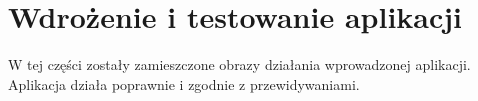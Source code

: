 \chapter{Wdrożenie i testowanie aplikacji}

W tej części zostały zamieszczone obrazy działania wprowadzonej aplikacji. Aplikacja działa
poprawnie i zgodnie z przewidywaniami. 

